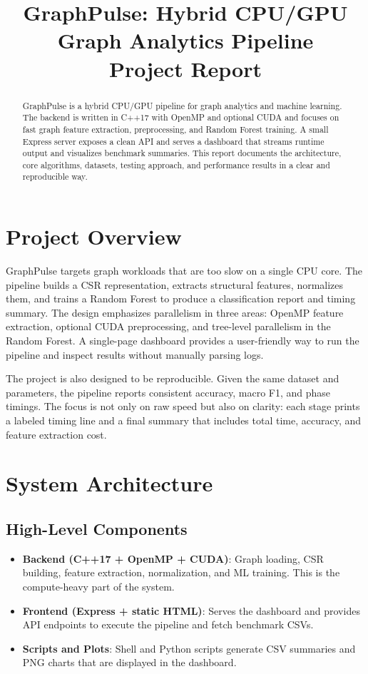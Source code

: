 \documentclass[11pt]{article}
\title{GraphPulse: Hybrid CPU/GPU Graph Analytics Pipeline\\Project Report}
\author{}
\date{}
\let\oldsection\section
\renewcommand{\section}{\clearpage\oldsection}
\begin{document}
\maketitle

\begin{abstract}
GraphPulse is a hybrid CPU/GPU pipeline for graph analytics and machine learning. The backend is written in C++17 with OpenMP and optional CUDA and focuses on fast graph feature extraction, preprocessing, and Random Forest training. A small Express server exposes a clean API and serves a dashboard that streams runtime output and visualizes benchmark summaries. This report documents the architecture, core algorithms, datasets, testing approach, and performance results in a clear and reproducible way.
\end{abstract}

\tableofcontents
\newpage

\section{Project Overview}
GraphPulse targets graph workloads that are too slow on a single CPU core. The pipeline builds a CSR representation, extracts structural features, normalizes them, and trains a Random Forest to produce a classification report and timing summary. The design emphasizes parallelism in three areas: OpenMP feature extraction, optional CUDA preprocessing, and tree-level parallelism in the Random Forest. A single-page dashboard provides a user-friendly way to run the pipeline and inspect results without manually parsing logs.

The project is also designed to be reproducible. Given the same dataset and parameters, the pipeline reports consistent accuracy, macro F1, and phase timings. The focus is not only on raw speed but also on clarity: each stage prints a labeled timing line and a final summary that includes total time, accuracy, and feature extraction cost.

\section{System Architecture}
\subsection{High-Level Components}
\begin{itemize}
  \item \textbf{Backend (C++17 + OpenMP + CUDA)}: Graph loading, CSR building, feature extraction, normalization, and ML training. This is the compute-heavy part of the system.
  \item \textbf{Frontend (Express + static HTML)}: Serves the dashboard and provides API endpoints to execute the pipeline and fetch benchmark CSVs.
  \item \textbf{Scripts and Plots}: Shell and Python scripts generate CSV summaries and PNG charts that are displayed in the dashboard.
\end{itemize}
\end{document}
